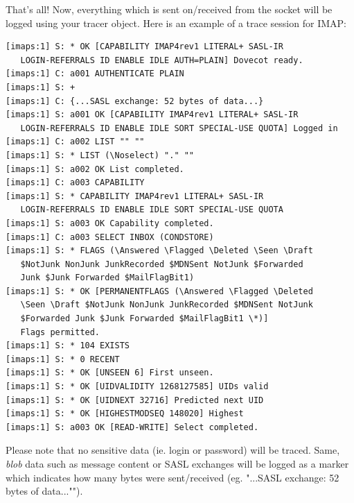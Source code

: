 That's all! Now, everything which is sent on/received from the socket
will be logged using your tracer object. Here is an example of a trace
session for IMAP:

\begin{verbatim}
[imaps:1] S: * OK [CAPABILITY IMAP4rev1 LITERAL+ SASL-IR
   LOGIN-REFERRALS ID ENABLE IDLE AUTH=PLAIN] Dovecot ready.
[imaps:1] C: a001 AUTHENTICATE PLAIN
[imaps:1] S: +
[imaps:1] C: {...SASL exchange: 52 bytes of data...}
[imaps:1] S: a001 OK [CAPABILITY IMAP4rev1 LITERAL+ SASL-IR
   LOGIN-REFERRALS ID ENABLE IDLE SORT SPECIAL-USE QUOTA] Logged in
[imaps:1] C: a002 LIST "" ""
[imaps:1] S: * LIST (\Noselect) "." ""
[imaps:1] S: a002 OK List completed.
[imaps:1] C: a003 CAPABILITY
[imaps:1] S: * CAPABILITY IMAP4rev1 LITERAL+ SASL-IR
   LOGIN-REFERRALS ID ENABLE IDLE SORT SPECIAL-USE QUOTA
[imaps:1] S: a003 OK Capability completed.
[imaps:1] C: a003 SELECT INBOX (CONDSTORE)
[imaps:1] S: * FLAGS (\Answered \Flagged \Deleted \Seen \Draft
   $NotJunk NonJunk JunkRecorded $MDNSent NotJunk $Forwarded
   Junk $Junk Forwarded $MailFlagBit1)
[imaps:1] S: * OK [PERMANENTFLAGS (\Answered \Flagged \Deleted
   \Seen \Draft $NotJunk NonJunk JunkRecorded $MDNSent NotJunk
   $Forwarded Junk $Junk Forwarded $MailFlagBit1 \*)]
   Flags permitted.
[imaps:1] S: * 104 EXISTS
[imaps:1] S: * 0 RECENT
[imaps:1] S: * OK [UNSEEN 6] First unseen.
[imaps:1] S: * OK [UIDVALIDITY 1268127585] UIDs valid
[imaps:1] S: * OK [UIDNEXT 32716] Predicted next UID
[imaps:1] S: * OK [HIGHESTMODSEQ 148020] Highest
[imaps:1] S: a003 OK [READ-WRITE] Select completed.
\end{verbatim}

Please note that no sensitive data (ie. login or password) will be traced.
Same, {\em blob} data such as message content or SASL exchanges will be logged
as a marker which indicates how many bytes were sent/received (eg. "{...SASL
exchange: 52 bytes of data...}"").
